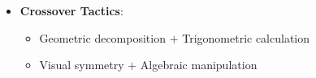 \documentclass[12pt]{article}
\begin{document}
\begin{tacticalbox}
\begin{itemize}[leftmargin=*]
\begin{itemize}
        \item \textbf{Trigonometric Identities}:
        \begin{itemize}
            \item $\sin(120^{\circ} - \theta) = \sin 120^{\circ} \cos\theta - \cos 120^{\circ} \sin\theta$
            \item $= \frac{\sqrt{3}}{2}\cos\theta + \frac{1}{2}\sin\theta$
            \item $\sin^2\theta + \cos^2\theta = 1$
        \end{itemize}
    \end{itemize}
    
    \item \textbf{Crossover Tactics}:
    \begin{itemize}
        \item Geometric decomposition $+$ Trigonometric calculation
        \item Visual symmetry $+$ Algebraic manipulation
    \end{itemize}
\end{itemize}
\end{tacticalbox}
\end{document}

